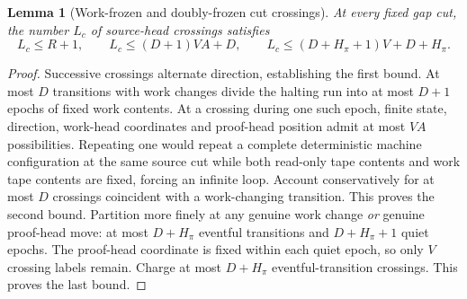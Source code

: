 \documentclass[11pt]{article}
\newtheorem{lemma}[theorem]{Lemma}
\begin{document}
\begin{lemma}[Work-frozen and doubly-frozen cut crossings]\label{lem:epochs}
At every fixed gap cut, the number $L_c$ of source-head crossings satisfies
\[
 L_c\le R+1,\qquad
 L_c\le(D+1)VA+D,\qquad
 L_c\le(D+H_\pi+1)V+D+H_\pi.
\tag{2}
\]
\end{lemma}
\begin{proof}
Successive crossings alternate direction, establishing the first bound. At most $D$ transitions with work changes divide the halting run into at most $D+1$ epochs of fixed work contents. At a crossing during one such epoch, finite state, direction, work-head coordinates and proof-head position admit at most $VA$ possibilities. Repeating one would repeat a complete deterministic machine configuration at the same source cut while both read-only tape contents and work tape contents are fixed, forcing an infinite loop. Account conservatively for at most $D$ crossings coincident with a work-changing transition. This proves the second bound. Partition more finely at any genuine work change \emph{or} genuine proof-head move: at most $D+H_\pi$ eventful transitions and $D+H_\pi+1$ quiet epochs. The proof-head coordinate is fixed within each quiet epoch, so only $V$ crossing labels remain. Charge at most $D+H_\pi$ eventful-transition crossings. This proves the last bound.\end{proof}
\end{document}

